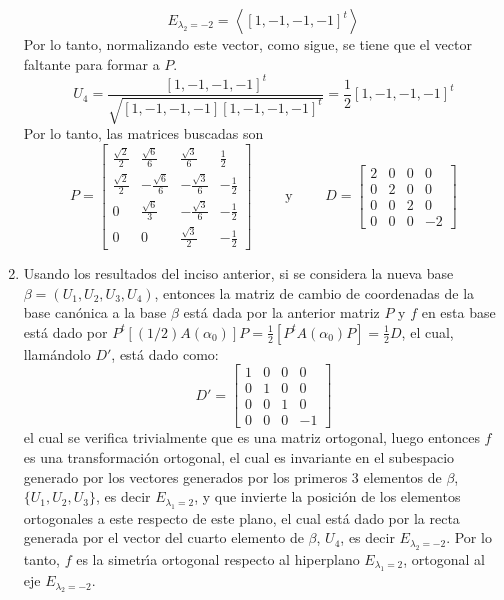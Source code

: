 \begin{solucion}
\begin{enumerate}[$a$)]
  \begin{equation*}
   E_{\lambda_2 = -2} = \left< [1,-1,-1, -1]^t \right>
  \end{equation*}
  Por lo tanto, normalizando este vector, como sigue, se tiene que el vector faltante para formar a $P$.
  \begin{equation*}
   U_4 = \frac{[1,-1,-1,-1]^t}{\sqrt{[1,-1,-1,-1][1,-1,-1,-1]^t}} = \frac{1}{2}[1,-1,-1,-1]^t
  \end{equation*}
  Por lo tanto, las matrices buscadas son
  \begin{equation*}
   P = 
   \begin{bmatrix}
    \frac{\sqrt{2}}{2} & \frac{\sqrt{6}}{6} & \frac{\sqrt{3}}{6} & \frac{1}{2} \\
    \frac{\sqrt{2}}{2} & - \frac{\sqrt{6}}{6} & - \frac{\sqrt{3}}{6} & - \frac{1}{2} \\
    0 & \frac{\sqrt{6}}{3} & - \frac{\sqrt{3}}{6} & - \frac{1}{2} \\
    0 & 0 &\frac{\sqrt{3}}{2} & - \frac{1}{2}
   \end{bmatrix}
   \qquad \text{ y } \qquad 
   D = 
   \begin{bmatrix}
    2 & 0 & 0 & 0 \\
    0 & 2 & 0 & 0 \\
    0 & 0 & 2 & 0 \\
    0 & 0 & 0 & -2
   \end{bmatrix}
  \end{equation*}
  
  \item Usando los resultados del inciso anterior, si se considera la nueva base $\beta = \left( U_1, U_2, U_3, U_4 \right)$, entonces la matriz de cambio de coordenadas de la base can\'onica a la base $\beta$ est\'a dada por la anterior matriz $P$ y $f$ en esta base est\'a dado por $P^t[(1/2)A(\alpha_0)]P = \frac{1}{2}\left[ P^tA(\alpha_0)P \right] = \frac{1}{2}D$, el cual, llam\'andolo $D'$, est\'a dado como:
  \begin{equation*}
   D' = 
   \begin{bmatrix}
    1 & 0 & 0 & 0 \\
    0 & 1 & 0 & 0 \\
    0 & 0 & 1 & 0 \\
    0 & 0 & 0 & -1
   \end{bmatrix}
  \end{equation*}
  el cual se verifica trivialmente que es una matriz ortogonal, luego entonces $f$ es una transformaci\'on ortogonal, el cual es invariante en el subespacio generado por los vectores generados por los primeros 3 elementos de $\beta$, $\{U_1, U_2, U_3\}$, es decir $E_{\lambda_1 = 2}$, y que invierte la posici\'on de los elementos ortogonales a este respecto de este plano, el cual est\'a dado por la recta generada por el vector del cuarto elemento de $\beta$, $U_4$, es decir $E_{\lambda_2 = -2}$. Por lo tanto, $f$ es la simetr\'{\i}a ortogonal respecto al hiperplano $E_{\lambda_1 = 2}$, ortogonal al eje $E_{\lambda_2 = -2}$.
  

\end{enumerate}
\end{solucion}
